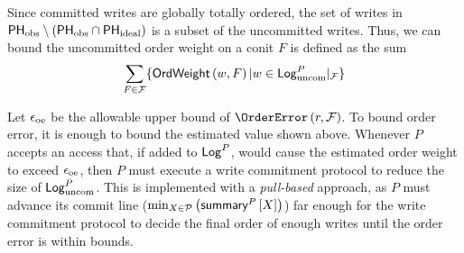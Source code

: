 \documentclass[]             %
{NASA}                       %
\theoremstyle{definition}
\begin{document}
Since committed writes are globally totally ordered, the set of writes
in
$\mathsf{PH}_{\textrm{obs}} \setminus \left(\mathsf{PH}_{\textrm{obs}} \cap
  \mathsf{PH}_{\textrm{ideal}}\right)$ is a subset of the uncommitted
writes. Thus, we can bound the uncommitted order weight on a conit
$F$ is defined as the sum
\[ \sum_{F \in \mathcal{F}} \{\mathsf{OrdWeight}\left(w, F\right) | w \in \mathsf{Log}_{\textrm{uncom}}^{P}|_{\mathcal{F}}\}
\]

Let $\epsilon_{\textrm{oe}}$ be the allowable upper bound of
$\OrderError\left(r,\mathcal{F}\right)$. To bound order error, it is
enough to bound the estimated value shown above. Whenever $P$ accepts
an access that, if added to $\mathsf{Log}^{P}$, would cause the estimated order
weight to exceed $\epsilon_{\textrm{oe}}$, then $P$ must execute a write commitment
protocol to reduce the size of $\mathsf{Log}_{\textrm{uncom}}^{P}$. This is implemented
with a \emph{pull-based} approach, as $P$ must advance its commit line
($\min_{X \in \mathcal{P}} \left(\mathsf{summary}^{P}\left[X\right]\right)$) far enough for
the write commitment protocol to decide the final order of enough
writes until the order error is within bounds.
\end{document}
